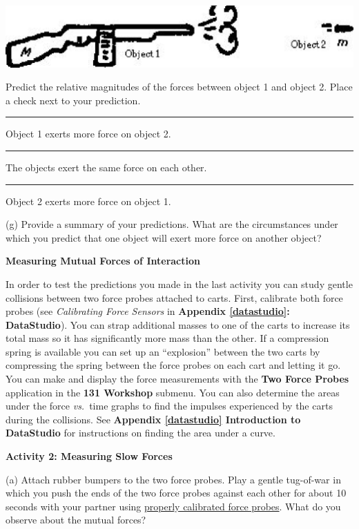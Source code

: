 \vspace{0.3cm}
{\par\centering \includegraphics{newtons_laws/newtons_laws_fig6.eps} \par}
\vspace{0.3cm}

Predict the relative magnitudes of the forces between object 1 and object 2.
Place a check next to your prediction. 

\rule{0.5in}{0.1pt} Object 1 exerts more force on object 2. 

\rule{0.5in}{0.1pt} The objects exert the same force on each other. 

\rule{0.5in}{0.1pt} Object 2 exerts more force on object 1.

(g) Provide a summary of your predictions. What are the circumstances under
which you predict that one object will exert more force on another object?
\vspace{30mm}

\textbf{Measuring Mutual Forces of Interaction }

In order to test the predictions you made in the last activity you can study
gentle collisions between two force probes attached to carts. First, calibrate both force probes 
(see \textit{Calibrating Force Sensors} in \textbf{Appendix \ref{datastudio}: DataStudio}). You can strap
additional masses to one of the carts to increase its total mass so it has significantly
more mass than the other. If a compression spring is available you can set up
an ``explosion'' between the two carts by compressing the spring
between the force probes on each cart and letting it go. You can make and display the force measurements with the \textbf{Two Force Probes} application in the \textbf{131 Workshop} submenu. You can also determine the areas under the force \textit{vs.}~time graphs to find the impulses experienced by the carts during the collisions. See \textbf{Appendix \ref{datastudio} Introduction to DataStudio}
for instructions on finding the area under a curve.

\textbf{Activity 2: Measuring Slow Forces} 

(a) Attach rubber bumpers to the two force probes. Play a gentle tug-of-war in which you push the ends of the two force probes against each other for about 10 seconds with your partner using 
\underline{properly calibrated force probes}. What do you observe about the mutual forces?
\vspace{20mm}

